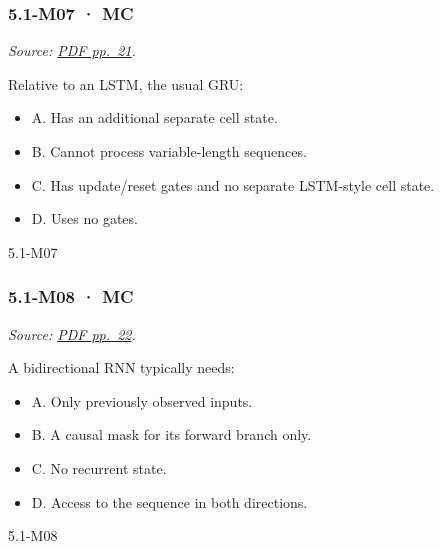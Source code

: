 \noindent\begin{minipage}{\linewidth}

\subsubsection{5.1-M07 · MC}\label{m07-mc-12}

\emph{Source:
\href{../Lecture\%20Slides/5.1.\%20Sequence\%20Models.pdf\#page=21}{PDF
pp.~21}.}

Relative to an LSTM, the usual GRU:

\begin{itemize}
\tightlist
\item
  A. Has an additional separate cell state.
\item
  B. Cannot process variable-length sequences.
\item
  C. Has update/reset gates and no separate LSTM-style cell state.
\item
  D. Uses no gates.
\end{itemize}

\begin{solution}[8mm]{5.1-M07}

\end{solution}
\end{minipage}\par\medskip

\noindent\begin{minipage}{\linewidth}

\subsubsection{5.1-M08 · MC}\label{m08-mc-12}

\emph{Source:
\href{../Lecture\%20Slides/5.1.\%20Sequence\%20Models.pdf\#page=22}{PDF
pp.~22}.}

A bidirectional RNN typically needs:

\begin{itemize}
\tightlist
\item
  A. Only previously observed inputs.
\item
  B. A causal mask for its forward branch only.
\item
  C. No recurrent state.
\item
  D. Access to the sequence in both directions.
\end{itemize}

\begin{solution}[8mm]{5.1-M08}

\end{solution}
\end{minipage}\par\medskip

